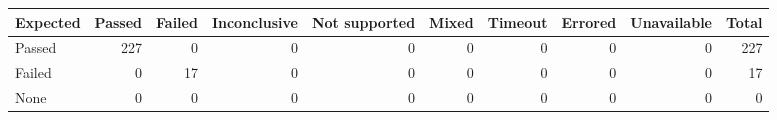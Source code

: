\begin{tabular}{lrrrrrrrrr}
\toprule
Expected & Passed & Failed & Inconclusive & Not supported & Mixed & Timeout & Errored & Unavailable & Total \\
\midrule
Passed & 227 & 0 & 0 & 0 & 0 & 0 & 0 & 0 & 227 \\
Failed & 0 & 17 & 0 & 0 & 0 & 0 & 0 & 0 & 17 \\
None & 0 & 0 & 0 & 0 & 0 & 0 & 0 & 0 & 0 \\
\bottomrule
\end{tabular}
